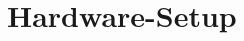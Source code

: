 \documentclass[root.tex]{subfiles}
\begin{document}
{\pagestyle{empty}}
\section{Hardware-Setup}
\label{chap:Hardware-Setup}
\end{document}
